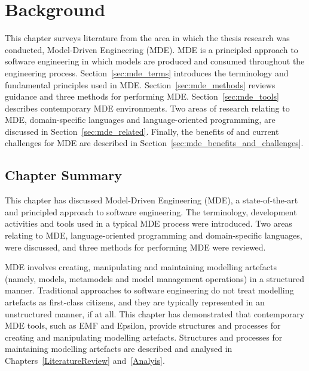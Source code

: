 
\chapter{Background}
\label{Background}
This chapter surveys literature from the area in which the thesis research was conducted, Model-Driven Engineering (MDE). MDE is a principled approach to software engineering in which models are produced and consumed throughout the engineering process. Section~\ref{sec:mde_terms} introduces the terminology and fundamental principles used in MDE. Section~\ref{sec:mde_methods} reviews guidance and three methods for performing MDE. Section~\ref{sec:mde_tools} describes contemporary MDE environments. Two areas of research relating to MDE, domain-specific languages and language-oriented programming, are discussed in Section~\ref{sec:mde_related}. Finally, the benefits of and current challenges for MDE are described in Section~\ref{sec:mde_benefits_and_challenges}.







\section{Chapter Summary}
This chapter has discussed Model-Driven Engineering (MDE), a state-of-the-art and principled approach to software engineering. The terminology, development activities and tools used in a typical MDE process were introduced. Two areas relating to MDE, language-oriented programming and domain-specific languages, were discussed, and three methods for performing MDE were reviewed.

MDE involves creating, manipulating and maintaining modelling artefacts (namely, models, metamodels and model management operations) in a structured manner. Traditional approaches to software engineering do not treat modelling artefacts as first-class citizens, and they are typically represented in an unstructured manner, if at all. This chapter has demonstrated that contemporary MDE tools, such as EMF and Epsilon, provide structures and processes for creating and manipulating modelling artefacts. Structures and processes for maintaining modelling artefacts are described and analysed in Chapters~\ref{LiteratureReview} and~\ref{Analyis}.